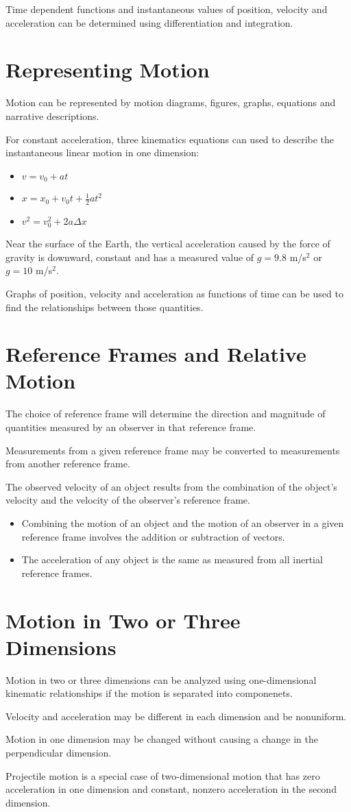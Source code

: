 \documentclass[../mech.tex]{subfiles}
\begin{document}
Time dependent functions and instantaneous values of position, velocity and acceleration can be determined using differentiation and integration.

\section{Representing Motion}
Motion can be represented by motion diagrams, figures, graphs, equations and narrative descriptions.

For constant acceleration, three kinematics equations can used to describe the instantaneous linear motion in one dimension:
\begin{itemize}
    \item $v=v_0 + at$
    \item $x=x_0+v_0 t + \frac{1}{2}at^2$
    \item $v^2=v_0^2+2a\Delta x$
\end{itemize}

Near the surface of the Earth, the vertical acceleration caused by the force of gravity is downward, constant and has a measured value of $g=9.8$ m/s$^2$ or $g=10$ m/s$^2$.

Graphs of position, velocity and acceleration as functions of time can be used to find the relationships between those quantities.

\section{Reference Frames and Relative Motion}
The choice of reference frame will determine the direction and magnitude of quantities measured by an observer in that reference frame.

Measurements from a given reference frame may be converted to measurements from another reference frame.

The observed velocity of an object results from the combination of the object's velocity and the velocity of the observer's reference frame.
\begin{itemize}
    \item Combining the motion of an object and the motion of an observer in a given reference frame involves the addition or subtraction of vectors.
    \item The acceleration of any object is the same as measured from all inertial reference frames.
\end{itemize}

\section{Motion in Two or Three Dimensions}
Motion in two or three dimensions can be analyzed using one-dimensional kinematic relationships if the motion is separated into componenets.

Velocity and acceleration may be different in each dimension and be nonuniform.

Motion in one dimension may be changed without causing a change in the perpendicular dimension.

Projectile motion is a special case of two-dimensional motion that has zero acceleration in one dimension and constant, nonzero acceleration in the second dimension.
\end{document}
